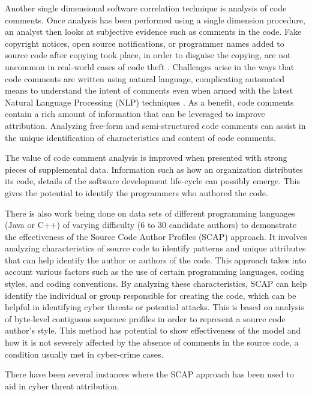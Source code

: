 \documentclass[12pt]{report}
\begin{document}
Another single dimensional software correlation technique is analysis of code comments.  Once analysis has been performed using a single dimension procedure, an analyst then looks at subjective evidence such as comments in the code.  Fake copyright notices, open source notifications, or programmer names added to source code after copying took place, in order to disguise the copying, are not uncommon in real-world cases of code theft \cite{sfbook:2011}.  Challenges arise in the ways that code comments are written using natural language, complicating automated means to understand the intent of comments even when armed with the latest Natural Language Processing (NLP) techniques \cite{artsci:2015}.  As a benefit, code comments contain a rich amount of information that can be leveraged to improve attribution.  Analyzing free-form and semi-structured code comments can assist in the unique identification of characteristics and content of code comments.

The value of code comment analysis is improved when presented with strong pieces of supplemental data.  Information such as how an organization distributes its code, details of the software development life-cycle can possibly emerge.  This gives the potential to identify the programmers who authored the code.  

There is also work being done on data sets of different programming languages (Java or C++) of varying difficulty (6 to 30 candidate authors) to demonstrate the effectiveness of the Source Code Author Profiles (SCAP) approach.  It involves analyzing characteristics of source code to identify patterns and unique attributes that can help identify the author or authors of the code. This approach takes into account various factors such as the use of certain programming languages, coding styles, and coding conventions. By analyzing these characteristics, SCAP can help identify the individual or group responsible for creating the code, which can be helpful in identifying cyber threats or potential attacks.  This is based on analysis of byte-level contiguous sequence profiles in order to represent a source code author’s style.  \cite{IFIP:2006} This method has potential to show effectiveness of the model and how it is not severely affected by the absence of comments in the source code, a condition usually met in cyber-crime cases.  

There have been several instances where the SCAP approach has been used to aid in cyber threat attribution.
\end{document}
